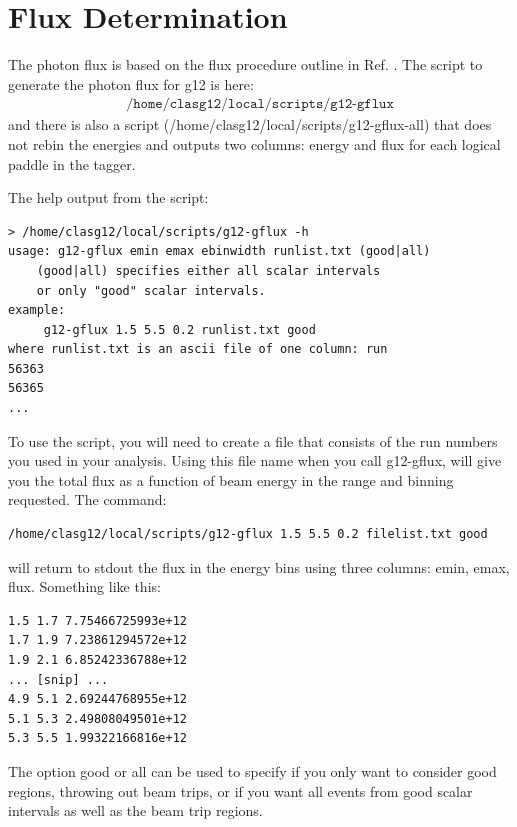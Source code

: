 \section{Flux Determination}

The photon flux is based on the flux procedure outline in Ref. \cite{clas.flux}. The script to generate the photon flux for g12 is here:
\begin{align}
    \texttt{/home/clasg12/local/scripts/g12-gflux} \nonumber
\end{align} and there is also a script (/home/clasg12/local/scripts/g12-gflux-all) that does not rebin the energies and outputs two columns: energy and flux for each logical paddle in the tagger.

The help output from the script:
\begin{verbatim}
> /home/clasg12/local/scripts/g12-gflux -h
usage: g12-gflux emin emax ebinwidth runlist.txt (good|all)
    (good|all) specifies either all scalar intervals
    or only "good" scalar intervals.
example:
     g12-gflux 1.5 5.5 0.2 runlist.txt good
where runlist.txt is an ascii file of one column: run
56363
56365
...
\end{verbatim}

To use the script, you will need to create a file that consists of the run numbers you used in your analysis. Using this file name when you call g12-gflux, will give you the total flux as a function of beam energy in the range and binning requested. The command:
\begin{verbatim}
/home/clasg12/local/scripts/g12-gflux 1.5 5.5 0.2 filelist.txt good
\end{verbatim}

will return to stdout the flux in the energy bins using three columns: emin, emax, flux. Something like this:
\begin{verbatim}
1.5 1.7 7.75466725993e+12
1.7 1.9 7.23861294572e+12
1.9 2.1 6.85242336788e+12
... [snip] ...
4.9 5.1 2.69244768955e+12
5.1 5.3 2.49808049501e+12
5.3 5.5 1.99322166816e+12
\end{verbatim}

The option good or all can be used to specify if you only want to consider good regions, throwing out beam trips, or if you want all events from good scalar intervals as well as the beam trip regions.

